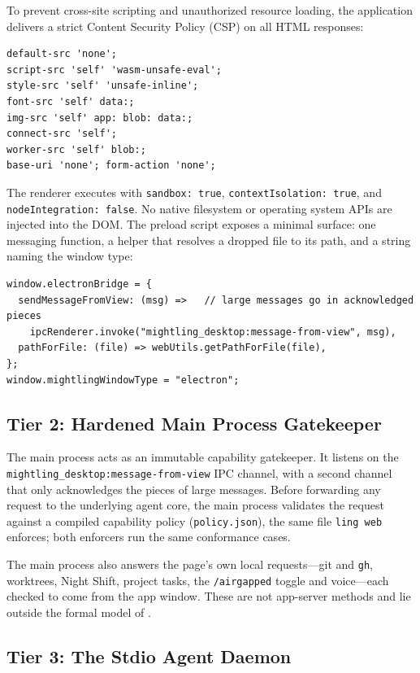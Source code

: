 \documentclass[11pt]{article}
\newcommand{\code}[1]{\texttt{#1}}
\begin{document}
To prevent cross-site scripting and unauthorized resource loading, the application delivers a strict Content Security
Policy (CSP) on all HTML responses:
\begin{lstlisting}
default-src 'none';
script-src 'self' 'wasm-unsafe-eval';
style-src 'self' 'unsafe-inline';
font-src 'self' data:;
img-src 'self' app: blob: data:;
connect-src 'self';
worker-src 'self' blob:;
base-uri 'none'; form-action 'none';
\end{lstlisting}
The renderer executes with \code{sandbox: true}, \code{contextIsolation: true}, and \code{nodeIntegration: false}.
No native filesystem or operating system APIs are injected into the DOM. The preload script exposes a minimal surface:
one messaging function, a helper that resolves a dropped file to its path, and a string naming the window type:
\begin{lstlisting}
window.electronBridge = {
  sendMessageFromView: (msg) =>   // large messages go in acknowledged pieces
    ipcRenderer.invoke("mightling_desktop:message-from-view", msg),
  pathForFile: (file) => webUtils.getPathForFile(file),
};
window.mightlingWindowType = "electron";
\end{lstlisting}

\subsection{Tier 2: Hardened Main Process Gatekeeper}

The main process acts as an immutable capability gatekeeper. It listens on the \code{mightling\_desktop:}\allowbreak\code{message-from-view}
IPC channel, with a second channel that only acknowledges the pieces of large messages. Before forwarding any request
to the underlying agent core, the main process validates the request against a compiled capability policy
(\code{policy.json}), the same file \code{ling web} enforces; both enforcers run the same conformance cases.

The main process also answers the page's own local requests—git and \code{gh}, worktrees, Night Shift, project tasks,
the \code{/airgapped} toggle and voice—each checked to come from the app window. These are not app-server methods and
lie outside the formal model of .

\subsection{Tier 3: The Stdio Agent Daemon}
\end{document}
